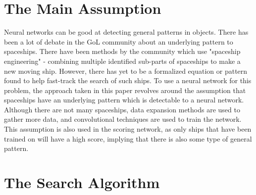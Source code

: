 \documentclass{l4proj}
\begin{document}
\section{The Main Assumption}

Neural networks can be good at detecting general patterns in objects. There has been a lot of debate in the GoL community about an underlying pattern to spaceships. There have been methods by the community which use "spaceship engineering" - combining multiple identified sub-parts of spaceships to make a new moving ship. However, there has yet to be a formalized equation or pattern found to help fast-track the search of such ships. To use a neural network for this problem, the approach taken in this paper revolves around the assumption that spaceships have an underlying pattern which is detectable to a neural network. Although there are not many spaceships, data expansion methods are used to gather more data, and convolutional techniques are used to train the network. This assumption is also used in the scoring network, as only ships that have been trained on will have a high score, implying that there is also some type of general pattern. 


\section{The Search Algorithm}
\end{document}
